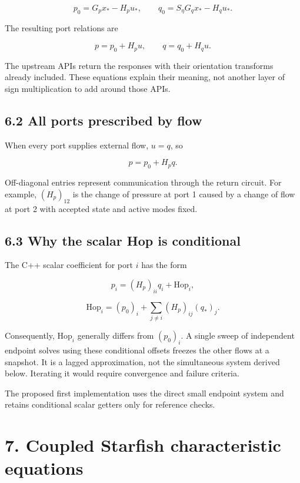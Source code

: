 \documentclass[11pt,a4paper]{article}
\begin{document}
\nopagebreak[3]
\[
p_0=G_px_*-H_pu_*,\qquad
q_0=S_\eta G_qx_*-H_qu_*.
\]


The resulting port relations are


\nopagebreak[3]
\[
\boxed{p=p_0+H_pu,\qquad q=q_0+H_qu.}
\]


The upstream APIs return the responses with their orientation transforms already included. These equations explain their meaning, not another layer of sign multiplication to add around those APIs.

\subsection{6.2 All ports prescribed by flow}
When every port supplies external flow, \(u=q\), so


\nopagebreak[3]
\[
\boxed{p=p_0+H_pq.}
\]


Off-diagonal entries represent communication through the return circuit. For example, \((H_p)_{12}\) is the change of pressure at port 1 caused by a change of flow at port 2 with accepted state and active modes fixed.

\subsection{6.3 Why the scalar Hop is conditional}
The C++ scalar coefficient for port \(i\) has the form


\nopagebreak[3]
\[
p_i=(H_p)_{ii}q_i+\mathrm{Hop}_i,
\]



\nopagebreak[3]
\[
\mathrm{Hop}_i=(p_0)_i+\sum_{j\ne i}(H_p)_{ij}(q_*)_j.
\]


Consequently, \(\mathrm{Hop}_i\) generally differs from \((p_0)_i\). A single sweep of independent endpoint solves using these conditional offsets freezes the other flows at a snapshot. It is a lagged approximation, not the simultaneous system derived below. Iterating it would require convergence and failure criteria.

The proposed first implementation uses the direct small endpoint system and retains conditional scalar getters only for reference checks.

\section{7. Coupled Starfish characteristic equations}
\end{document}
